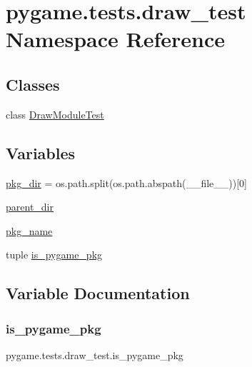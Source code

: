 \hypertarget{namespacepygame_1_1tests_1_1draw__test}{}\section{pygame.\+tests.\+draw\+\_\+test Namespace Reference}
\label{namespacepygame_1_1tests_1_1draw__test}
\subsection*{Classes}
\begin{DoxyCompactItemize}
\item 
class \hyperlink{classpygame_1_1tests_1_1draw__test_1_1_draw_module_test}{Draw\+Module\+Test}
\end{DoxyCompactItemize}
\subsection*{Variables}
\begin{DoxyCompactItemize}
\item 
\hyperlink{namespacepygame_1_1tests_1_1draw__test_ad8c64ed43c74925d8bf8c6514af5222a}{pkg\+\_\+dir} = os.\+path.\+split(os.\+path.\+abspath(\+\_\+\+\_\+file\+\_\+\+\_\+))\mbox{[}0\mbox{]}
\item 
\hyperlink{namespacepygame_1_1tests_1_1draw__test_a92539d7bbbdec83059abc13dcde4f334}{parent\+\_\+dir}
\item 
\hyperlink{namespacepygame_1_1tests_1_1draw__test_a43d4bd556abf4a39d3e07bd62a40ee36}{pkg\+\_\+name}
\item 
tuple \hyperlink{namespacepygame_1_1tests_1_1draw__test_a2923779006d03b776147532687656811}{is\+\_\+pygame\+\_\+pkg}
\end{DoxyCompactItemize}


\subsection{Variable Documentation}
\mbox{\label{namespacepygame_1_1tests_1_1draw__test_a2923779006d03b776147532687656811}} 
\subsubsection{\texorpdfstring{is\+\_\+pygame\+\_\+pkg}{is\_pygame\_pkg}}
{\footnotesize\ttfamily pygame.\+tests.\+draw\+\_\+test.\+is\+\_\+pygame\+\_\+pkg}

